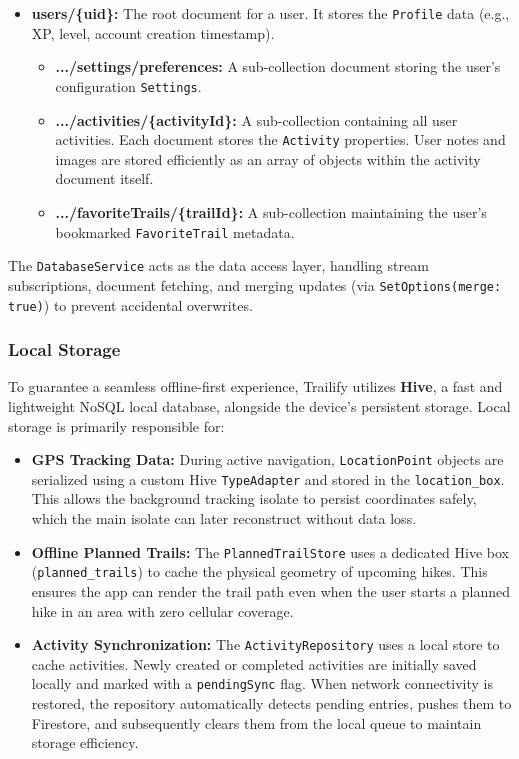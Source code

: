 \documentclass[12pt]{article}
\begin{document}
\begin{itemize}
    \item \textbf{users/\{uid\}:} The root document for a user. It stores the \texttt{Profile} data (e.g., XP, level, account creation timestamp).
    \begin{itemize}
        \item \textbf{.../settings/preferences:} A sub-collection document storing the user's configuration \texttt{Settings}.
        \item \textbf{.../activities/\{activityId\}:} A sub-collection containing all user activities. Each document stores the \texttt{Activity} properties. User notes and images are stored efficiently as an array of objects within the activity document itself.
        \item \textbf{.../favoriteTrails/\{trailId\}:} A sub-collection maintaining the user's bookmarked \texttt{FavoriteTrail} metadata.
    \end{itemize}
\end{itemize}
The \texttt{DatabaseService} acts as the data access layer, handling stream subscriptions, document fetching, and merging updates (via \texttt{SetOptions(merge: true)}) to prevent accidental overwrites.

\subsubsection{Local Storage}
To guarantee a seamless offline-first experience, Trailify utilizes \textbf{Hive}, a fast and lightweight NoSQL local database, alongside the device's persistent storage. Local storage is primarily responsible for:

\begin{itemize}
    \item \textbf{GPS Tracking Data:} During active navigation, \texttt{LocationPoint} objects are serialized using a custom Hive \texttt{TypeAdapter} and stored in the \texttt{location\_box}. This allows the background tracking isolate to persist coordinates safely, which the main isolate can later reconstruct without data loss.
    \item \textbf{Offline Planned Trails:} The \texttt{PlannedTrailStore} uses a dedicated Hive box (\texttt{planned\_trails}) to cache the physical geometry of upcoming hikes. This ensures the app can render the trail path even when the user starts a planned hike in an area with zero cellular coverage.
    \item \textbf{Activity Synchronization:} The \texttt{ActivityRepository} uses a local store to cache activities. Newly created or completed activities are initially saved locally and marked with a \texttt{pendingSync} flag. When network connectivity is restored, the repository automatically detects pending entries, pushes them to Firestore, and subsequently clears them from the local queue to maintain storage efficiency.
\end{itemize}
\end{document}
